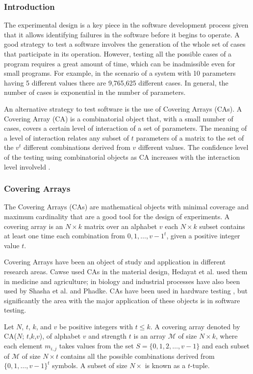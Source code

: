 \subsubsection{Introduction}
The experimental design is a key piece in the software development process given that it allows identifying failures in the software before it begins to operate. A good strategy to test a software involves the generation of the whole set of cases that participate in its operation. However, testing all the possible cases of a program requires a great amount of time, which can be inadmissible even for small programs\cite{Cohen:2003}. For example, in the scenario of a system with 10 parameters having 5 different values there are 9,765,625 different cases. In general, the number of cases is exponential in the number of parameters.

An alternative strategy to test software is the use of Covering Arrays (CAs). A Covering Array (CA) is a combinatorial object that, with a small number of cases, covers a certain level of interaction of a set of parameters. The meaning of a level of interaction relates any subset of $t$ parameters of a matrix to the set of the $v^{t}$ different combinations derived from $v$ different values. The confidence level of the testing using combinatorial objects as CA increases with the interaction level involveld \cite{Kuhn:2008}.

\subsubsection{Covering Arrays}
The Covering Arrays (CAs) are mathematical objects with minimal coverage and maximum cardinality that are a good tool for the design of experiments. A covering array is an $N \times k$ matrix over an alphabet $v$ each $N \times k$ subset contains at least one time each combination from ${0,1,\ldots,v−1}^{t}$, given a positive integer value $t$.

Covering Arrays have been an object of study and application in different research areas. Cawse \cite{Cawse:2003} used CAs in the material design, Hedayat et al. \cite{Hedayat:1999} used them in medicine and agriculture; in biology and industrial processes have also been used by Shasha et al. \cite{Shasha:2001} and Phadke\cite{Phadke:1995}. CAs have been used in hardware testing \cite{Vadde:2004}, but significantly the area with the major application of these objects is in software testing\cite{Burr:1998,Yilmaz:2004}.

Let $N$, $t$, $k$, and $v$ be positive integers with $t \leq k$. A covering array denoted by CA($N$; $t$,$k$,$v$), of alphabet $v$ and strength $t$ is an array $\mathcal{M}$ of size $N \times k$, where each element $m_{i,j}$ takes values from the set $S = \{0,1,2,\ldots,v-1\}$ and each subset of $\mathcal{M}$ of size $N \times t$ contains all the possible combinations derived from $\{0,1,\ldots,v-1\}^{t}$ symbols. A subset of size $N \times $ is known as a $t$-tuple.

